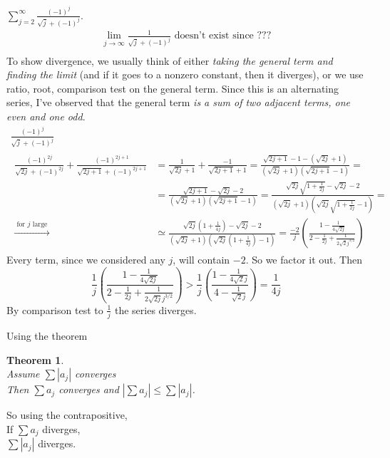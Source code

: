 \documentclass[twoside]{amsart}
\theoremstyle{plain}
\newtheorem{theorem}{Theorem}
\theoremstyle{definition}
\newcommand{\exercisehead}[1]
  {\smallskip
   \noindent{\small\bf Exercise #1.}}
\begin{document}
\exercisehead{7} $\sum_{j=2}^{\infty} \frac{ (-1)^j }{ \sqrt{j} + (-1)^j }$.  
\[
\begin{gathered}
  \lim_{j\to \infty} \frac{ 1 }{ \sqrt{j} + (-1)^j } \text{ doesn't exist since ???} \\
\end{gathered}
\]
To show divergence, we usually think of either \emph{taking the general term and finding the limit} (and if it goes to a nonzero constant, then it diverges), or we use ratio, root, comparison test on the general term.  Since this is an alternating series, I've observed that the general term \emph{ is a sum of two adjacent terms, one even and one odd}.  
\[
\begin{gathered}
  \frac{ (-1)^j }{ \sqrt{j} + (-1)^j } \\
  \begin{aligned}
    \frac{ (-1)^{2j} }{ \sqrt{2j} + (-1)^{2j}} + \frac{ (-1)^{2j + 1} }{ \sqrt{ 2j+1} + (-1)^{2j+1} } & = \frac{1}{ \sqrt{2j} + 1 } + \frac{-1}{ \sqrt{2j+1} + 1 } = \frac{ \sqrt{2j+1}  - 1 - (\sqrt{2j} + 1 ) }{ (\sqrt{2j} + 1 )(\sqrt{ 2j+1} - 1 ) } = \\ 
    & = \frac{ \sqrt{ 2j+1} - \sqrt{2j} - 2 }{ (\sqrt{2j} + 1 )( \sqrt{2j+1} - 1 ) } = \frac{ \sqrt{2j} \sqrt{ 1 + \frac{1}{2j} } - \sqrt{2j} - 2 }{ (\sqrt{2j} + 1 )(\sqrt{2j} \sqrt{ 1 + \frac{1}{2j} } - 1 ) } = \\
    \xrightarrow{ \text{ for $j$ large } } & \simeq \frac{ \sqrt{2j} \left( 1 + \frac{1}{4j} \right) - \sqrt{2j} - 2 }{ (\sqrt{2j} + 1 )( \sqrt{2j} \left( 1 + \frac{1}{4j} \right) - 1 ) } = \frac{-2}{j} \left( \frac{ 1 - \frac{1}{4 \sqrt{2j}} }{ 2 - \frac{1}{2j} + \frac{1}{ 2\sqrt{2} j^{3/2} } } \right) 
\end{aligned}
\end{gathered}
\]
Every term, since we considered any $j$, will contain $-2$.  So we factor it out.  Then
\[
\frac{1}{j} \left( \frac{ 1 - \frac{1}{4 \sqrt{2j} } }{ 2 - \frac{1}{2j} + \frac{1}{ 2 \sqrt{2j} j^{3/2}} } \right) > \frac{1}{j} \left( \frac{ 1-  \frac{1}{ 4\sqrt{2} j} }{ 4 - \frac{1}{ \sqrt{2} j } } \right) = \frac{1}{4j}
\]
By comparison test to $\frac{1}{j}$ the series diverges.  

\exercisehead{8} Using the theorem
\begin{theorem} \quad \\
  Assume $\sum |a_j| $ converges \medskip \\
  \phantom{ Assu } Then $\sum a_j$ converges and $|\sum a_j | \leq \sum |a_j |$.  
\end{theorem}
So using the contrapositive,  \medskip \\
If $\sum a_j$ diverges, \\
\phantom{ If } $\sum |a_j|$ diverges.  
\end{document}
